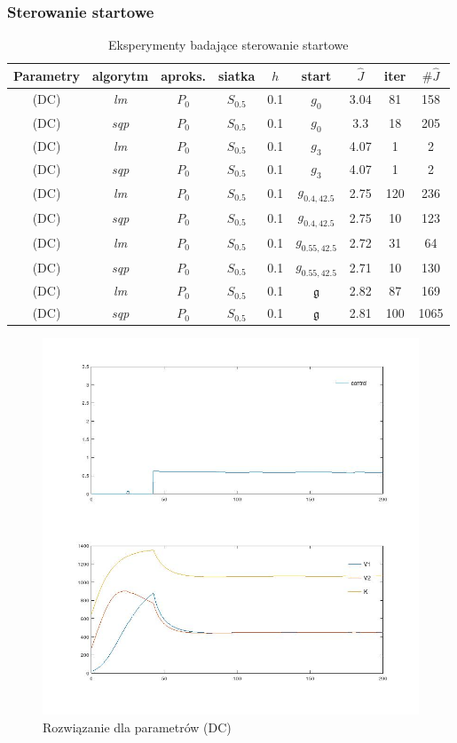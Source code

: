 \documentclass[11pt]{article}
\begin{document}
\subsubsection{Sterowanie startowe}

\begin{table}[h]
  \begin{center}
    \begin{tabular}{|c|c|c|c|c|c|c|c|c|}
      \hline
      Parametry & algorytm & aproks. & siatka & $h$ & start & $\hat{J}$ & iter & $\#\hat{J}$ \\
      \hline
      (DC) & {\it lm\/} & $P_0$ & $S_{0.5}$ & 0.1 & $g_0$ & 3.04 & 81 & 158 \\
      \hline
      (DC) & {\it sqp\/} & $P_0$ & $S_{0.5}$ & 0.1 & $g_0$ & 3.3 & 18 & 205 \\
      \hline
      (DC) & {\it lm\/} & $P_0$ & $S_{0.5}$ & 0.1 & $g_3$ & 4.07 & 1 & 2 \\
      \hline
      (DC) & {\it sqp\/} & $P_0$ & $S_{0.5}$ & 0.1 & $g_3$ & 4.07 & 1 & 2 \\
      \hline
      (DC) & {\it lm\/} & $P_0$ & $S_{0.5}$ & 0.1 & $g_{0.4,42.5}$ & 2.75 & 120 & 236 \\
      \hline
      (DC) & {\it sqp\/} & $P_0$ & $S_{0.5}$ & 0.1 & $g_{0.4,42.5}$ & 2.75 & 10 & 123 \\
      \hline
      (DC) & {\it lm\/} & $P_0$ & $S_{0.5}$ & 0.1 & $g_{0.55,42.5}$ & 2.72 & 31 & 64 \\
      \hline
      (DC) & {\it sqp\/} & $P_0$ & $S_{0.5}$ & 0.1 & $g_{0.55,42.5}$ & 2.71 & 10 & 130 \\
      \hline
      (DC) & {\it lm\/} & $P_0$ & $S_{0.5}$ & 0.1 & $\mathfrak{g}$ & 2.82 & 87 & 169 \\
      \hline
      (DC) & {\it sqp\/} & $P_0$ & $S_{0.5}$ & 0.1 & $\mathfrak{g}$ & 2.81 & 100 & 1065 \\
      \hline
    \end{tabular}
    \caption{Eksperymenty badające sterowanie startowe}\label{start_tbl}
  \end{center}
\end{table}

\begin{figure}[h]
  \centering
  \includegraphics[width=.5\textwidth]{../plots/plot_param2_best}
  \caption{Rozwiązanie dla parametrów (DC)}\label{param2_best_sol}
\end{figure}
\end{document}

